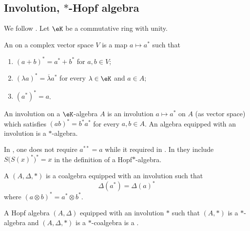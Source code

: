 \subsection{Involution, $*$-Hopf algebra}
\label{subsecHopfInvolution}

We follow \cite{TimmernannInvitation}. Let \( \eK\) be a commutative ring with unity.

\begin{definition}
    An  on a complex vector space \( V\) is a map \( a\mapsto a^*\) such that
    
    \begin{enumerate}
        \item
            \( (a+b)^*=a^*+b^*\) for \( a,b\in V\);
        \item
            \( (\lambda a)^*=\overline{ \lambda }a^*\) for every \( \lambda\in\eK\) and \( a\in A\);
        \item
            \( (a^*)^*=a\).
    \end{enumerate}
    An involution on a \( \eK\)-algebra \( A\) is an involution \( a\mapsto a^*\) on \( A\) (as vector space) which satisfies \( (ab)^*=b^*a^*\) for every \( a,b\in A\). An algebra equipped with an involution is a \( *\)-algebra.
\end{definition}

\begin{probleme}
    In \cite{SoibelmanI}, one does not require \( a^{**}=a\) while it required in \cite{TimmernannInvitation}. In \cite{Kassel} they include \( S\big( S(x)^* \big)^*=x\) in the definition of a Hopf\( *\)-algebra.
\end{probleme}

\begin{definition}
    A  \( (A,\Delta,*)\) is a coalgebra equipped with an involution such that
    \begin{equation}
        \Delta(a^*)=\Delta(a)^*
    \end{equation}
    where \( (a\otimes b)^*=a^*\otimes b^*\).
\end{definition}

\begin{definition}
    A Hopf algebra \( (A,\Delta)\) equipped with an involution \( *\) such that \( (A,*)\) is a \( *\)-algebra and \( (A,\Delta,*)\) is a \( *\)-coalgebra is a .
\end{definition}


